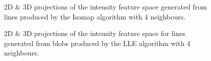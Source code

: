 \begin{figure}[H]
	\centering
	\caption{2D \& 3D projections of the intensity feature space generated from lines produced by the Isomap algorithm with 4 neighbours.}\label{fig:intensity_iso_mapping_lines}
\end{figure}

\begin{figure}[H]
	\centering
	\caption{2D \& 3D projections of the intensity feature space for lines generated from blobs produced by the LLE algorithm with 4 neighbours.}\label{fig:intensity_LLE_mapping_lines}
\end{figure}
\clearpage


